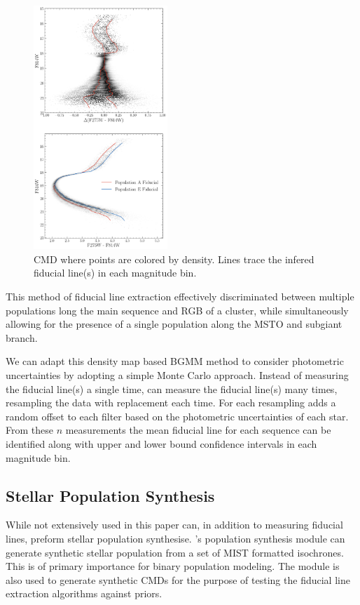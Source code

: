 \begin{figure}
	\centering
	\includegraphics[width=0.45\textwidth]{vertFit.png}
	\caption{CMD where points are colored by density. Lines trace the infered 
	fiducial line(s) in each magnitude bin.}
	\label{fig:vertFit}
\end{figure}

This method of fiducial line extraction effectively discriminated between
multiple populations long the main sequence and RGB of a cluster, while
simultaneously allowing for the presence of a single population along the MSTO
and subgiant branch. 

We can adapt this density map based BGMM method to consider photometric
uncertainties by adopting a simple Monte Carlo approach. Instead of measuring
the fiducial line(s) a single time, \fidanka can measure the fiducial line(s)
many times, resampling the data with replacement each time. For each resampling
\fidanka adds a random offset to each filter based on the photometric
uncertainties of each star. From these $n$ measurements the mean fiducial line
for each sequence can be identified along with upper and lower bound confidence
intervals in each magnitude bin.

\subsection{Stellar Population Synthesis}
While not extensively used in this paper \fidanka can, in addition to measuring fiducial
lines, preform stellar population synthesise. \fidanka's population synthesis
module can generate synthetic stellar population from a set of MIST formatted
isochrones. This is of primary importance for binary population modeling. The
module is also used to generate synthetic CMDs for the purpose of testing the
fiducial line extraction algorithms against priors.


